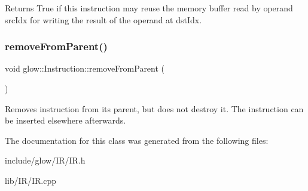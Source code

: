 \begin{DoxyReturn}{Returns}
True if this instruction may reuse the memory buffer read by operand {\ttfamily src\+Idx} for writing the result of the operand at {\ttfamily dst\+Idx}. 
\end{DoxyReturn}
\mbox{\label{classglow_1_1_instruction_a629b572e87d2515df70e10eac20ee5da}} 
\subsubsection{\texorpdfstring{remove\+From\+Parent()}{removeFromParent()}}
{\footnotesize\ttfamily void glow\+::\+Instruction\+::remove\+From\+Parent (\begin{DoxyParamCaption}{ }\end{DoxyParamCaption})}

Removes instruction from its parent, but does not destroy it. The instruction can be inserted elsewhere afterwards. 

The documentation for this class was generated from the following files\+:\begin{DoxyCompactItemize}
\item 
include/glow/\+I\+R/I\+R.\+h\item 
lib/\+I\+R/I\+R.\+cpp\end{DoxyCompactItemize}
